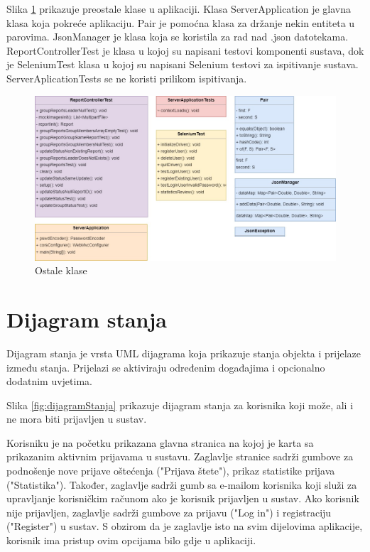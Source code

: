 			Slika \ref{fig:utils} prikazuje preostale klase u aplikaciji. Klasa ServerApplication je glavna klasa koja pokreće aplikaciju. Pair je pomoćna klasa za držanje nekin entiteta u parovima. JsonManager je klasa koja se koristila za rad nad .json datotekama. ReportControllerTest je klasa u kojoj su napisani testovi komponenti sustava, dok je SeleniumTest klasa u kojoj su napisani Selenium testovi za ispitivanje sustava. ServerAplicationTests se ne koristi prilikom ispitivanja.
			
			\begin{figure}[H]
				\includegraphics[width=\textwidth]{slike/dijagramRazreda/testovi_i_utils.jpg} %
				\caption{Ostale klase}
				\label{fig:utils} %
			\end{figure}
			
			\eject
			
			
			\section{Dijagram stanja}
			
			Dijagram stanja je vrsta UML dijagrama koja prikazuje stanja objekta i prijelaze između stanja. Prijelazi se aktiviraju određenim događajima i opcionalno dodatnim uvjetima. 
			
			Slika \ref{fig:dijagramStanja} prikazuje dijagram stanja za korisnika koji može, ali i ne mora biti prijavljen u sustav. 
			
			Korisniku je na početku prikazana glavna stranica na kojoj je karta sa prikazanim aktivnim prijavama u sustavu. Zaglavlje stranice sadrži gumbove za podnošenje nove prijave oštećenja ("Prijava štete"), prikaz statistike prijava ("Statistika"). Također, zaglavlje sadrži gumb sa e-mailom korisnika koji služi za upravljanje korisničkim računom ako je korisnik prijavljen u sustav. Ako korisnik nije prijavljen, zaglavlje sadrži gumbove za prijavu ("Log in") i registraciju ("Register") u  sustav. S obzirom da je zaglavlje isto na svim dijelovima aplikacije, korisnik ima pristup ovim opcijama bilo gdje u aplikaciji.
			
